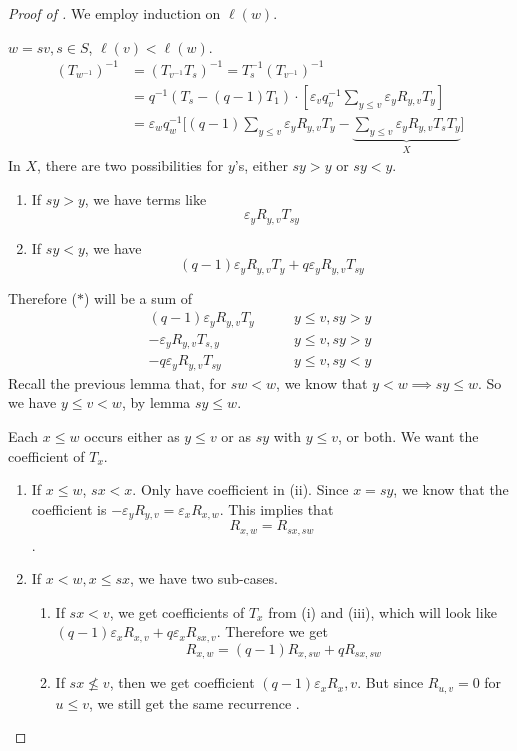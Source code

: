 \begin{proof}[Proof of ]
We employ induction on $\ell(w)$.

$w=sv,s\in S$, $\ell(v)<\ell(w)$.
\begin{align*}
	(T_{w^{-1}})^{-1}&=(T_{v^{-1}}T_s)^{-1}=T_s^{-1}(T_{v^{-1}})^{-1}\\
	&=q^{-1}(T_s-(q-1)T_1)\cdot \left[\varepsilon_v q_v^{-1}\sum_{y\leq v}\varepsilon_y R_{y,v}T_y\right]\\
	&=\varepsilon_w q_w^{-1}\bigg[(q-1)\sum_{y\leq v}\varepsilon_y R_{y,v} T_y-\underbrace{\sum_{y\leq v}\varepsilon_y R_{y,v}T_sT_y}_{X}\bigg]\tag{$*$}
\end{align*}
In $X$, there are two possibilities for $y$'s, either $sy>y$ or $sy<y$.
\begin{enumerate}
	\item If $sy>y$, we have terms like
	\[\varepsilon_y R_{y,v}T_{sy}\]
	\item If $sy<y$, we have
	\[(q-1)\varepsilon_yR_{y,v}T_y+q\varepsilon_yR_{y,v}T_{sy}\]
\end{enumerate}

	Therefore ($*$) will be a sum of
	\begin{align*}
		\tag{i}(q-1)\varepsilon_y R_{y,v}T_y\quad\quad&y\leq v,sy>y\\
		\tag{ii}-\varepsilon_yR_{y,v}T_{s,y}\quad\quad&y\leq v,sy>y\\
		\tag{iii}-q\varepsilon_y R_{y,v} T_{sy}\quad\quad&y\leq v,sy<y
	\end{align*}
	Recall the previous lemma that, for $sw<w$, we know that $y<w\implies sy\leq w$. So we have $y\leq v<w$, by lemma $sy\leq w$.
	
	Each $x\leq w$ occurs either as $y\leq v$ or as $sy$ with $y\leq v$, or both. We want the coefficient of $T_x$.
	
	\begin{enumerate}
\item If $x\leq w$, $sx<x$. Only have coefficient in (ii). Since $x=sy$, we know that the coefficient is $-\varepsilon_yR_{y,v}=\varepsilon_x R_{x,w}$. This implies that \begin{equation}R_{x,w}=R_{sx,sw}\end{equation}.
\item If $x<w,x\leq sx$, we have two sub-cases.
\begin{enumerate}
\item If $sx<v$, we get coefficients of $T_x$ from (i) and (iii), which will look like $(q-1)\varepsilon_x R_{x,v}+q\varepsilon_x R_{sx,v}$. Therefore we get
\begin{equation}\label{eq:R_rec_2}
	R_{x,w}=(q-1)R_{x,sw}+qR_{sx,sw}
\end{equation}
\item If $sx\not\leq v$, then we get coefficient $(q-1)\varepsilon_xR_x,v$. But since $R_{u,v}=0$ for $u\leq v$, we still get the same recurrence .
\end{enumerate}
\end{enumerate}
\end{proof}
